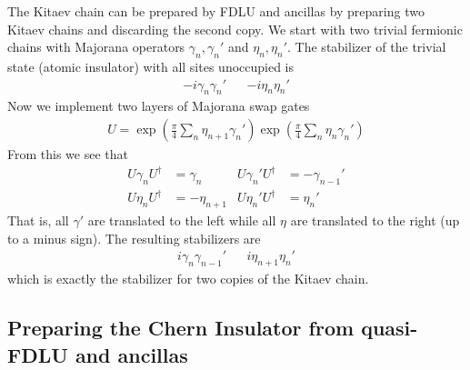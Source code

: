 \documentclass[nofootinbib,prx,twocolumn,showpacs,superscriptaddress,notitlepage,amsmath,amssymb]{revtex4-2}
\theoremstyle{definition}
\begin{document}
The Kitaev chain can be prepared by FDLU and ancillas by preparing two Kitaev chains and discarding the second copy. We start with two trivial fermionic chains with Majorana operators $\gamma_n, \gamma_n'$ and $\eta_n, \eta_n'$. The stabilizer of the trivial state (atomic insulator) with all sites unoccupied is
\begin{align}
    -i\gamma_n\gamma_n' & & -i\eta_n \eta_n'
\end{align}
Now we implement two layers of Majorana swap gates
\begin{align}
    U = \exp\left(\frac{\pi}{4}\sum_n\eta_{n+1} \gamma_n' \right) \exp\left(\frac{\pi}{4} \sum_n  \eta_n\gamma_n'\right) 
\end{align}
From this we see that
\begin{align}
U\gamma_n U^\dagger &= \gamma_n & U\gamma_n' U^\dagger &= -\gamma_{n-1}'\\
U\eta_n U^\dagger &= -\eta_{n+1} & U\eta_n' U^\dagger &= \eta_n'
\end{align}
That is, all $\gamma'$ are translated to the left while all $\eta$ are translated to the right (up to a minus sign). The resulting stabilizers are 
\begin{align}
    i\gamma_n\gamma_{n-1}' & & i\eta_{n+1} \eta_n'
\end{align}
which is exactly the stabilizer for two copies of the Kitaev chain.


\subsection{Preparing the Chern Insulator from quasi-FDLU and ancillas}\label{app:Chern}
\end{document}
